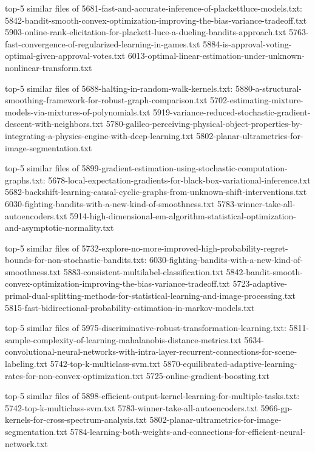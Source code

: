 \documentclass[11pt]{article}
\begin{document}
top-5 similar files of
5681-fast-and-accurate-inference-of-plackettluce-models.txt:
5842-bandit-smooth-convex-optimization-improving-the-bias-variance-tradeoff.txt
5903-online-rank-elicitation-for-plackett-luce-a-dueling-bandits-approach.txt
5763-fast-convergence-of-regularized-learning-in-games.txt
5884-is-approval-voting-optimal-given-approval-votes.txt
6013-optimal-linear-estimation-under-unknown-nonlinear-transform.txt

top-5 similar files of 5688-halting-in-random-walk-kernels.txt:
5880-a-structural-smoothing-framework-for-robust-graph-comparison.txt
5702-estimating-mixture-models-via-mixtures-of-polynomials.txt
5919-variance-reduced-stochastic-gradient-descent-with-neighbors.txt
5780-galileo-perceiving-physical-object-properties-by-integrating-a-physics-engine-with-deep-learning.txt
5802-planar-ultrametrics-for-image-segmentation.txt

top-5 similar files of
5899-gradient-estimation-using-stochastic-computation-graphs.txt:
5678-local-expectation-gradients-for-black-box-variational-inference.txt
5682-backshift-learning-causal-cyclic-graphs-from-unknown-shift-interventions.txt
6030-fighting-bandits-with-a-new-kind-of-smoothness.txt
5783-winner-take-all-autoencoders.txt
5914-high-dimensional-em-algorithm-statistical-optimization-and-asymptotic-normality.txt

top-5 similar files of
5732-explore-no-more-improved-high-probability-regret-bounds-for-non-stochastic-bandits.txt:
6030-fighting-bandits-with-a-new-kind-of-smoothness.txt
5883-consistent-multilabel-classification.txt
5842-bandit-smooth-convex-optimization-improving-the-bias-variance-tradeoff.txt
5723-adaptive-primal-dual-splitting-methods-for-statistical-learning-and-image-processing.txt
5815-fast-bidirectional-probability-estimation-in-markov-models.txt

top-5 similar files of
5975-discriminative-robust-transformation-learning.txt:
5811-sample-complexity-of-learning-mahalanobis-distance-metrics.txt
5634-convolutional-neural-networks-with-intra-layer-recurrent-connections-for-scene-labeling.txt
5742-top-k-multiclass-svm.txt
5870-equilibrated-adaptive-learning-rates-for-non-convex-optimization.txt
5725-online-gradient-boosting.txt

top-5 similar files of
5898-efficient-output-kernel-learning-for-multiple-tasks.txt:
5742-top-k-multiclass-svm.txt 5783-winner-take-all-autoencoders.txt
5966-gp-kernels-for-cross-spectrum-analysis.txt
5802-planar-ultrametrics-for-image-segmentation.txt
5784-learning-both-weights-and-connections-for-efficient-neural-network.txt
\end{document}
